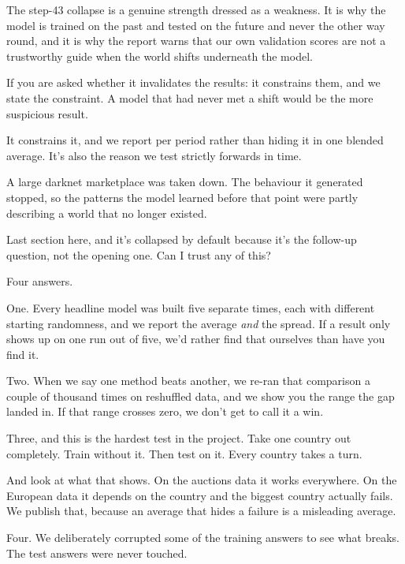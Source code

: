 \documentclass[11pt]{article}
\begin{document}
\begin{means}
The step-43 collapse is a genuine strength dressed as a weakness. It is why the
model is trained on the past and tested on the future and never the other way
round, and it is why the report warns that our own validation scores are not a
trustworthy guide when the world shifts underneath the model.

If you are asked whether it invalidates the results: it constrains them, and we
state the constraint. A model that had never met a shift would be the more
suspicious result.
\end{means}

\begin{asked}
 It constrains it,
and we report per period rather than hiding it in one blended average. It's
also the reason we test strictly forwards in time.

 A large darknet marketplace was taken down. The
behaviour it generated stopped, so the patterns the model learned before that
point were partly describing a world that no longer existed.
\end{asked}


\begin{saythis}
Last section here, and it's collapsed by default because it's the follow-up
question, not the opening one. Can I trust any of this?

Four answers. 

One. Every headline model was built five separate times, each with different
starting randomness, and we report the average \emph{and} the spread. If a
result only shows up on one run out of five, we'd rather find that ourselves
than have you find it.

Two. When we say one method beats another, we re-ran that comparison a couple
of thousand times on reshuffled data, and we show you the range the gap landed
in. If that range crosses zero, we don't get to call it a win.

Three, and this is the hardest test in the project. Take one country out
completely. Train without it. Then test on it. Every country takes a turn.

And look at what that shows. On the auctions data it works everywhere. On the
European data it depends on the country \bt and the biggest country actually
fails. We publish that, because an average that hides a failure is a misleading
average.

Four. We deliberately corrupted some of the training answers to see what
breaks. The test answers were never touched.
\end{saythis}
\end{document}

